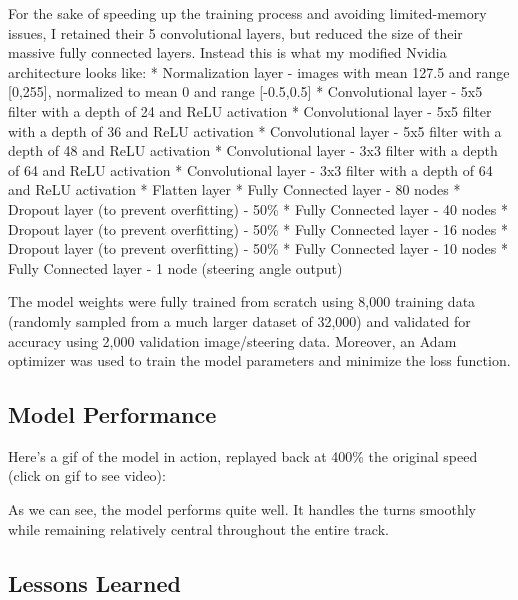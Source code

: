 \documentclass[11pt]{article}
\begin{document}
For the sake of speeding up the training process and avoiding
limited-memory issues, I retained their 5 convolutional layers, but
reduced the size of their massive fully connected layers. Instead this
is what my modified Nvidia architecture looks like: * Normalization
layer - images with mean 127.5 and range {[}0,255{]}, normalized to mean
0 and range {[}-0.5,0.5{]} * Convolutional layer - 5x5 filter with a
depth of 24 and ReLU activation * Convolutional layer - 5x5 filter with
a depth of 36 and ReLU activation * Convolutional layer - 5x5 filter
with a depth of 48 and ReLU activation * Convolutional layer - 3x3
filter with a depth of 64 and ReLU activation * Convolutional layer -
3x3 filter with a depth of 64 and ReLU activation * Flatten layer *
Fully Connected layer - 80 nodes * Dropout layer (to prevent
overfitting) - 50\% * Fully Connected layer - 40 nodes * Dropout layer
(to prevent overfitting) - 50\% * Fully Connected layer - 16 nodes *
Dropout layer (to prevent overfitting) - 50\% * Fully Connected layer -
10 nodes * Fully Connected layer - 1 node (steering angle output)

The model weights were fully trained from scratch using 8,000 training
data (randomly sampled from a much larger dataset of 32,000) and
validated for accuracy using 2,000 validation image/steering data.
Moreover, an Adam optimizer was used to train the model parameters and
minimize the loss function.

\subsection{Model Performance}\label{model-performance}

Here's a gif of the model in action, replayed back at 400\% the original
speed (click on gif to see video):

As we can see, the model performs quite well. It handles the turns
smoothly while remaining relatively central throughout the entire track.

\subsection{Lessons Learned}\label{lessons-learned}
\end{document}
